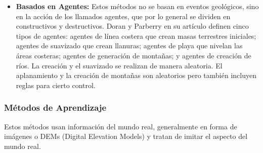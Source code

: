 \begin{itemize}
                \item \textbf{Basados en Agentes:} Estos métodos no se basan en eventos geológicos, sino en la acción de los llamados agentes, que por lo general se dividen en constructivos y destructivos. Doran y Parberry en su artículo \cite{Doran2010} definen cinco tipos de agentes: agentes de línea costera que crean masas terrestres iniciales; agentes de suavizado que crean llanuras; agentes de playa que nivelan las áreas costeras; agentes de generación de montañas; y agentes de creación de ríos. La creación y el suavizado se realizan de manera aleatoria. El aplanamiento y la creación de montañas son aleatorios pero también incluyen reglas para cierto control.  
            \end{itemize}

        \subsubsection{Métodos de Aprendizaje}
        Estos métodos usan información del mundo real, generalmente en forma de imágenes o DEMs (Digital Elevation Models) y tratan de imitar el aspecto del mundo real.
